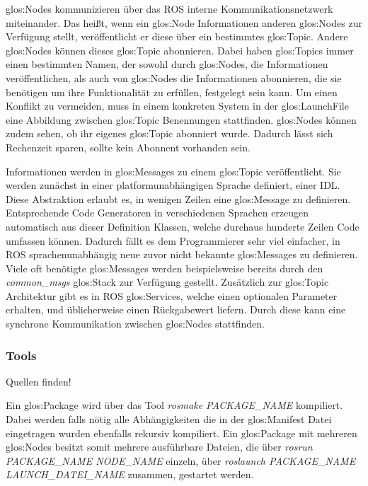 \glspl{glos:Node} kommunizieren über das \gls{ROS} interne Kommunikationsnetzwerk miteinander. Das heißt, wenn ein \gls{glos:Node} Informationen anderen \glspl{glos:Node} zur Verfügung stellt, veröffentlicht er diese über ein bestimmtes \gls{glos:Topic}. Andere \glspl{glos:Node} können dieses \gls{glos:Topic} abonnieren. Dabei haben \glspl{glos:Topic} immer einen bestimmten Namen, der sowohl durch \glspl{glos:Node}, die Informationen veröffentlichen, als auch von \glspl{glos:Node} die Informationen abonnieren, die sie benötigen um ihre Funktionalität zu erfüllen, festgelegt sein kann. Um einen Konflikt zu vermeiden, muss in einem konkreten System in der \gls{glos:LaunchFile} eine Abbildung zwischen \gls{glos:Topic} Benennungen stattfinden. \glspl{glos:Node} können zudem sehen, ob ihr eigenes \gls{glos:Topic} abonniert wurde. Dadurch lässt sich Rechenzeit sparen, sollte kein Abonnent vorhanden sein.

Informationen werden in \glspl{glos:Message} zu einem \gls{glos:Topic} veröffentlicht. Sie werden zunächst in einer platformunabhängigen Sprache definiert, einer \gls{IDL}. Diese Abstraktion erlaubt es, in wenigen Zeilen eine \gls{glos:Message} zu definieren. Entsprechende Code Generatoren in verschiedenen Sprachen erzeugen automatisch aus dieser Definition Klassen, welche durchaus hunderte Zeilen Code umfassen können. Dadurch fällt es dem Programmierer sehr viel einfacher, in \gls{ROS} sprachenunabhängig neue zuvor nicht bekannte \glspl{glos:Message} zu definieren. Viele oft benötigte \glspl{glos:Message} werden beispielsweise bereits durch den \emph{common\_msgs} \gls{glos:Stack} zur Verfügung gestellt. Zusätzlich zur \gls{glos:Topic} Architektur gibt es in \gls{ROS} \glspl{glos:Service}, welche einen optionalen Parameter erhalten, und üblicherweise einen Rückgabewert liefern. Durch diese kann eine synchrone Kommunikation zwischen \glspl{glos:Node} stattfinden. 

\subsubsection{Tools}

{\color{red}Quellen finden!}

Ein \gls{glos:Package} wird über das Tool \emph{rosmake PACKAGE\_NAME} kompiliert. Dabei werden falls nötig alle Abhängigkeiten die in der \gls{glos:Manifest} Datei eingetragen wurden ebenfalls rekursiv kompiliert. Ein \gls{glos:Package} mit mehreren \glspl{glos:Node} besitzt somit mehrere ausführbare Dateien, die über \emph{rosrun PACKAGE\_NAME NODE\_NAME} einzeln, über \emph{roslaunch PACKAGE\_NAME LAUNCH\_DATEI\_NAME} zusammen, gestartet werden.

